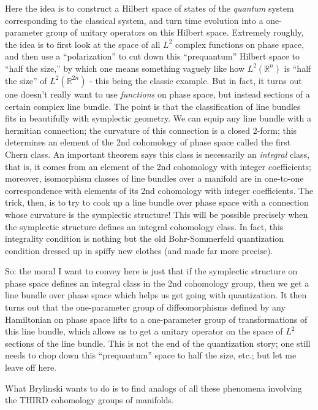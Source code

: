 \documentclass{article}
\begin{document}
Here the idea is to construct a Hilbert space of states of the
\emph{quantum} system corresponding to the classical system, and turn
time evolution into a one-parameter group of unitary operators on this
Hilbert space. Extremely roughly, the idea is to first look at the space
of all \(L^2\) complex functions on phase space, and then use a
``polarization'' to cut down this ``prequantum'' Hilbert space to ``half
the size,'' by which one means something vaguely like how
\(L^2(\mathbb{R}^n)\) is ``half the size'' of \(L^2(\mathbb{R}^{2n})\) -
this being the classic example. But in fact, it turns out one doesn't
really want to use \emph{functions} on phase space, but instead sections
of a certain complex line bundle. The point is that the classification
of line bundles fits in beautifully with symplectic geometry. We can
equip any line bundle with a hermitian connection; the curvature of this
connection is a closed 2-form; this determines an element of the 2nd
cohomology of phase space called the first Chern class. An important
theorem says this class is necessarily an \emph{integral} class, that
is, it comes from an element of the 2nd cohomology with integer
coefficients; moreover, isomorphism classes of line bundles over a
manifold are in one-to-one correspondence with elements of its 2nd
cohomology with integer coefficients. The trick, then, is to try to cook
up a line bundle over phase space with a connection whose curvature is
the symplectic structure! This will be possible precisely when the
symplectic structure defines an integral cohomology class. In fact, this
integrality condition is nothing but the old Bohr-Sommerfeld
quantization condition dressed up in spiffy new clothes (and made far
more precise).

So: the moral I want to convey here is just that if the symplectic
structure on phase space defines an integral class in the 2nd cohomology
group, then we get a line bundle over phase space which helps us get
going with quantization. It then turns out that the one-parameter group
of diffeomorphisms defined by any Hamiltonian on phase space lifts to a
one-parameter group of transformations of this line bundle, which allows
us to get a unitary operator on the space of \(L^2\) sections of the
line bundle. This is not the end of the quantization story; one still
needs to chop down this ``prequantum'' space to half the size, etc.; but
let me leave off here.

What Brylinski wants to do is to find analogs of all these phenomena
involving the THIRD cohomology groups of manifolds.
\end{document}
